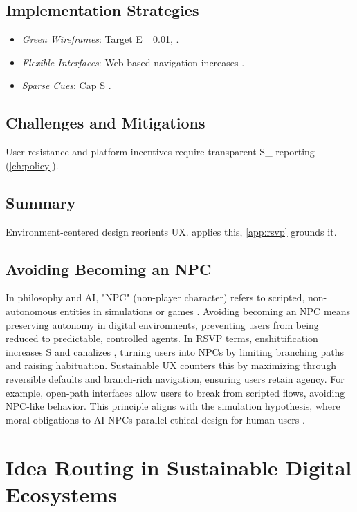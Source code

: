 \documentclass[openany]{book}
\newcommand{\vvec}{\mathbf{v}} %
\newcommand{\Sent}{S} %
\newcommand{\Eint}{E_{\mathrm{int}}} %
\newcommand{\Auton}{\mathcal{A}} %
\newcommand{\SUX}{S_{\mathrm{UX}}} %
\newcommand{\kWh}{\mathrm{kWh}}
\begin{document}
\section{Implementation Strategies}
\label{sec:paradigm-strategies}
\begin{itemize}
  \item \emph{Green Wireframes}: Target \Eint{} \leq \SI{0.01}{\kWh}, \Auton{} .
  \item \emph{Flexible Interfaces}: Web-based navigation increases \Auton{}.
  \item \emph{Sparse Cues}: Cap \Sent{} \citep{colak2024}.
\end{itemize}

\section{Challenges and Mitigations}
\label{sec:paradigm-challenges}
User resistance and platform incentives require transparent \SUX{} reporting (\cref{ch:policy}).

\section{Summary}
Environment-centered design reorients UX.  applies this, \cref{app:rsvp} grounds it.

\section{Avoiding Becoming an NPC}
\label{sec:paradigm-npc}

In philosophy and AI, "NPC" (non-player character) refers to scripted, non-autonomous entities in simulations or games \citep{rosa2024}. Avoiding becoming an NPC means preserving autonomy in digital environments, preventing users from being reduced to predictable, controlled agents. In RSVP terms, enshittification increases \Sent{} and canalizes \vvec{}, turning users into NPCs by limiting branching paths and raising habituation. Sustainable UX counters this by maximizing \Auton{} through reversible defaults and branch-rich navigation, ensuring users retain agency. For example, open-path interfaces allow users to break from scripted flows, avoiding NPC-like behavior. This principle aligns with the simulation hypothesis, where moral obligations to AI NPCs parallel ethical design for human users \citep{rosa2024}.

\chapter{Idea Routing in Sustainable Digital Ecosystems}
\label{ch:routing}
\end{document}
